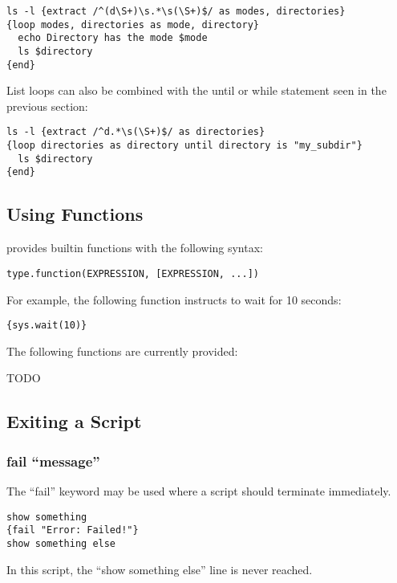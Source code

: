 \begin{lstlisting}
ls -l {extract /^(d\S+)\s.*\s(\S+)$/ as modes, directories}
{loop modes, directories as mode, directory}
  echo Directory has the mode $mode
  ls $directory
{end}
\end{lstlisting}

List loops can also be combined with the until or while statement seen in 
the previous section: 

\begin{lstlisting}
ls -l {extract /^d.*\s(\S+)$/ as directories}
{loop directories as directory until directory is "my_subdir"}
  ls $directory
{end}
\end{lstlisting}


\subsection{Using Functions}

\product provides builtin functions with the following syntax: 

\begin{lstlisting}
type.function(EXPRESSION, [EXPRESSION, ...])
\end{lstlisting}

For example, the following function instructs \product to wait for 10 seconds: 

\begin{lstlisting}
{sys.wait(10)}
\end{lstlisting}

The following functions are currently provided: 

TODO


\subsection{Exiting a Script}

\subsubsection{fail ``message''}

The ``fail'' keyword may be used where a script should terminate immediately. 

\begin{lstlisting}
show something
{fail "Error: Failed!"}
show something else
\end{lstlisting}

In this script, the ``show something else'' line is never reached. 

